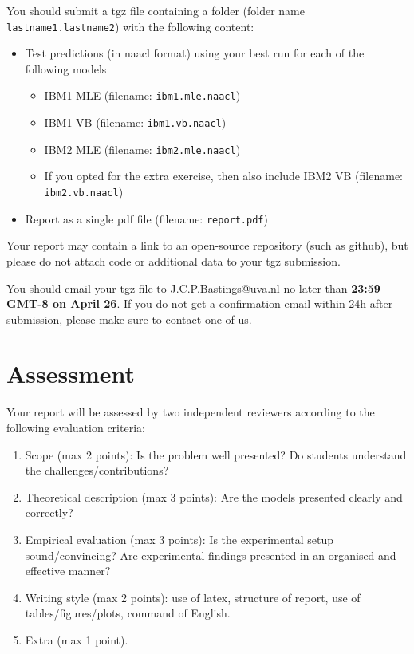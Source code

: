 You should submit a tgz file containing a folder (folder name {\tt lastname1.lastname2}) with the following content: 
\begin{itemize}
	\item Test predictions (in naacl format) using your best run for each of the following models
	\begin{itemize}
		\item IBM1 MLE (filename: {\tt ibm1.mle.naacl})
		\item IBM1 VB (filename: {\tt ibm1.vb.naacl})
		\item IBM2 MLE (filename: {\tt ibm2.mle.naacl})
		\item If you opted for the extra exercise, then also include IBM2 VB (filename: {\tt ibm2.vb.naacl})
	\end{itemize}
	\item Report as a single pdf file (filename: {\tt report.pdf})
\end{itemize}

Your report may contain a link to an open-source repository (such as github), but please do not attach code or additional data to your tgz submission.

You should email your tgz file to \url{J.C.P.Bastings@uva.nl} no later than {\bf 23:59 GMT-8 on April 26}. If you do not get a confirmation email within 24h after submission, please make sure to contact one of us.

\section{Assessment}

Your report will be assessed by two independent reviewers according to the following evaluation criteria:
\begin{enumerate}
	\item Scope (max 2 points): Is the problem well presented? Do students understand the challenges/contributions?
	\item Theoretical description (max 3 points): Are the models presented clearly and correctly?
	\item Empirical evaluation (max 3 points): Is the experimental setup sound/convincing? Are experimental findings presented in an organised and effective manner? 
	\item Writing style (max 2 points): use of latex, structure of report, use of tables/figures/plots, command of English.	
	\item Extra (max 1 point).
\end{enumerate}



